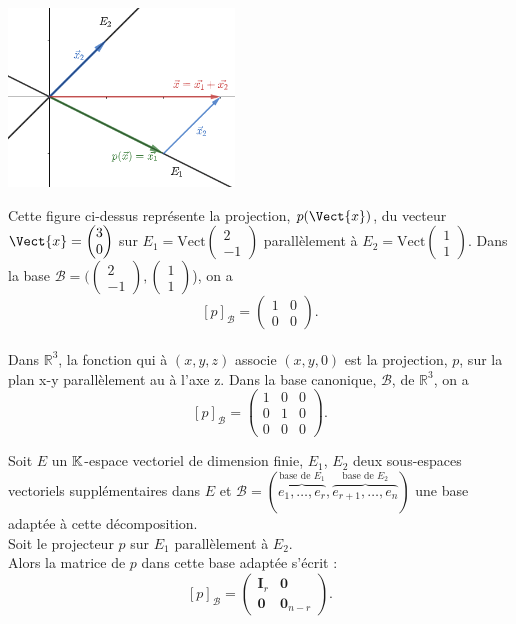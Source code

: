 \documentclass{book}
\begin{document}
\begin{Exemple}
\begin{center}
\includegraphics[width=6cm]{projecteur2d.png}
\end{center}
Cette figure ci-dessus   représente la projection, $p(\Vect{x})$, du vecteur $\Vect{x}=\begin{pmatrix}
3\\0
\end{pmatrix}$ sur $E_1=\mathrm{Vect}\begin{pmatrix}
2\\-1
\end{pmatrix}$ parallèlement à $E_2=\mathrm{Vect}\begin{pmatrix}
1\\1\end{pmatrix}$. Dans la base $\mathcal{B}=(\begin{pmatrix}
2\\-1
\end{pmatrix},\begin{pmatrix}
1\\1\end{pmatrix}$), on a 
$$ [p]_{\mathcal{B}} =\begin{pmatrix}1&0\\0&0\end{pmatrix}.$$
 \\
Dans $\mathbb {R}^3$, la fonction qui à $(x, y, z)$ associe $(x, y, 0)$ est la projection, $p$, sur la plan x-y parallèlement au à l'axe z. Dans la base canonique, $\mathcal{B}$, de  $\mathbb {R}^3$, on a 
$$ [p]_{\mathcal{B}}=\begin{pmatrix}1&0&0\\0&1&0\\0&0&0\end{pmatrix}.$$
\end{Exemple}
\begin{Proposition} Soit $E$ un $\mathbb{K} $-espace vectoriel de dimension finie, $E_1$, $E_2$ deux sous-espaces vectoriels supplémentaires dans $E$ et $\mathcal  {B}=(\overbrace{e_{1},\ldots ,e_{r}}^{\text{base de }E_1},\overbrace{e_{{r+1}},\ldots ,e_{n}}^{\text{base de }E_2})$ une base adaptée à cette décomposition.\\
Soit le projecteur $p$ sur $E_1$ parallèlement à $E_2$.\\  
Alors la matrice de $p$ dans cette base adaptée s'écrit :
$$[p]_{\mathcal{B}}=\begin{pmatrix}{\mathbf  {I}}_{{r}}&{\mathbf  {0}}\\{\mathbf  {0}}&{\mathbf  {0}}_{{n-r}}\end{pmatrix}.$$
\end{Proposition}
\end{document}
